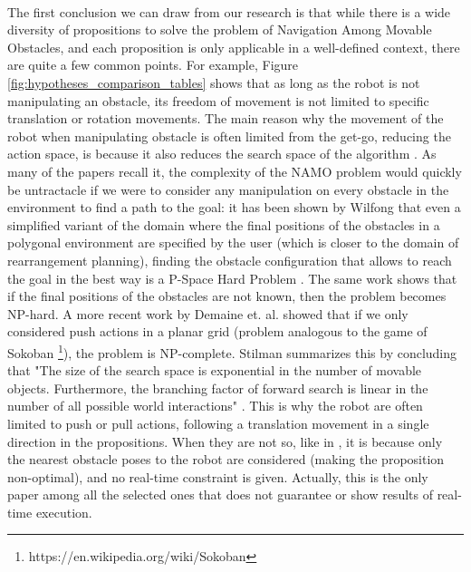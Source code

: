 \paragraph{} The first conclusion we can draw from our research is that while there is a wide diversity of propositions to solve the problem of Navigation Among Movable Obstacles, and each proposition is only applicable in a well-defined context, there are quite a few common points. For example, Figure \ref{fig:hypotheses_comparison_tables} shows that as long as the robot is not manipulating an obstacle, its freedom of movement is not limited to specific translation or rotation movements. The main reason why the movement of the robot when manipulating obstacle is often limited from the get-go, reducing the action space, is because it also reduces the search space of the algorithm \parencite{stilman_navigation_2005}. As many of the papers \parencite{stilman_navigation_2005, stilman_planning_2007, stilman_planning_2008, wu_navigation_2010, levihn_planning_2013, levihn_locally_2014, scholz_navigation_2016} recall it, the complexity of the NAMO problem would quickly be untractacle if we were to consider any manipulation on every obstacle in the environment to find a path to the goal: it has been shown by Wilfong that even a simplified variant of the domain where the final positions of the obstacles in a polygonal environment are specified by the user (which is closer to the domain of rearrangement planning), finding the obstacle configuration that allows to reach the goal in the best way is a P-Space Hard Problem \parencite{wilfong_motion_1991}. The same work shows that if the final positions of the obstacles are not known, then the problem becomes NP-hard. A more recent work by Demaine et. al. showed that if we only considered push actions in a planar grid (problem analogous to the game of Sokoban \footnote{https://en.wikipedia.org/wiki/Sokoban}), the problem is NP-complete. Stilman summarizes this by concluding that "The size of the search space is exponential in the number of movable objects. Furthermore, the branching factor of forward search is linear in the number of all possible world interactions" \parencite{stilman_planning_2008}. This is why the robot are often limited to push or pull actions, following a translation movement in a single direction in the propositions. When they are not so, like in \parencite{okada_environment_2004}, it is because only the nearest obstacle poses to the robot are considered (making the proposition non-optimal), and no real-time constraint is given. Actually, this is the only paper among all the selected ones that does not guarantee or show results of real-time execution.

